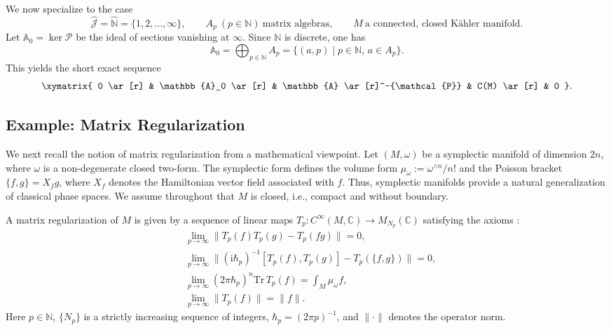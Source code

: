 \documentclass[12pt]{article}
\newcommand{\im}{\mathrm{i}}
\theoremstyle{definition} %
\theoremstyle{plain} %
\theoremstyle{remark} %
\theoremstyle{underline}
\begin{document}
We now specialize to the case
\[
    \hat{\mathcal{J}}=\hat{\mathbb{N}}=\{1,2,\dots,\infty\},
    \qquad
    A_p\ (p\in\mathbb{N})\ \text{matrix algebras},
    \qquad
    M\ \text{a connected, closed K\"ahler manifold}.
\]
Let $\mathbb{A}_0=\ker\mathcal{P}$ be the ideal of sections vanishing at $\infty$.
Since $\mathbb{N}$ is discrete, one has
\[
    \mathbb{A}_0=\bigoplus_{p\in\mathbb{N}}A_p
    =\{(a,p)\mid p\in\mathbb{N},\,a\in A_p\}.
\]
This yields the short exact sequence
\[
    \xymatrix{
    0 \ar[r] & \mathbb{A}_0 \ar[r] & \mathbb{A} \ar[r]^-{\mathcal{P}} & C(M) \ar[r] & 0 }.
\]


\subsection{Example: Matrix Regularization}

We next recall the notion of matrix regularization from a mathematical viewpoint.
Let $(M,\omega)$ be a symplectic manifold of dimension $2n$, where $\omega$ is a non-degenerate closed two-form.
The symplectic form defines the volume form $\mu_{\omega}:=\omega^{\wedge n}/n!$ and the Poisson bracket
$\{f,g\}=X_f g$, where $X_f$ denotes the Hamiltonian vector field associated with $f$.
Thus, symplectic manifolds provide a natural generalization of classical phase spaces.
We assume throughout that $M$ is closed, i.e., compact and without boundary.

A matrix regularization of $M$ is given by a sequence of linear maps $T_p:C^\infty(M,\mathbb{C})\to M_{N_p}(\mathbb{C})$ satisfying the axioms \cite{Arnlind:2010ac,Hoppe}:
\begin{align}
    \label{mat reg 1}
    &\lim_{p\to\infty}\|T_p(f)T_p(g)-T_p(fg)\|=0,\\
    \label{mat reg 2}
    &\lim_{p\to\infty}\|(\im\hbar_p)^{-1}[T_p(f),T_p(g)]-T_p(\{f,g\})\|=0,\\
    \label{mat reg 3}
    &\lim_{p\to\infty}(2\pi\hbar_p)^n\mathrm{Tr}\,T_p(f)
    =\int_M\mu_{\omega}f,\\
    \label{mat reg 4}
    &\lim_{p\to\infty}\|T_p(f)\|=\|f\|.
\end{align}
Here $p\in\mathbb{N}$, $\{N_p\}$ is a strictly increasing sequence of integers, $\hbar_p=(2\pi p)^{-1}$, and $\|\cdot\|$ denotes the operator norm.
\end{document}
